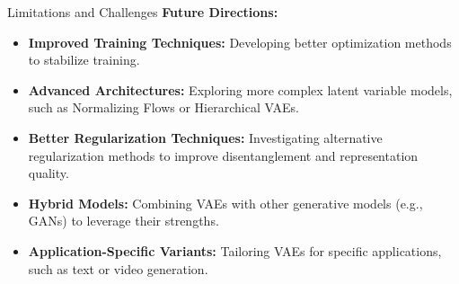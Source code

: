 \begin{frame}[allowframebreaks]{Limitations and Challenges}
\textbf{Future Directions:}
\begin{itemize}
    \item \textbf{Improved Training Techniques:} Developing better optimization methods to stabilize training.
    \item \textbf{Advanced Architectures:} Exploring more complex latent variable models, such as Normalizing Flows or Hierarchical VAEs.
    \item \textbf{Better Regularization Techniques:} Investigating alternative regularization methods to improve disentanglement and representation quality.
    \item \textbf{Hybrid Models:} Combining VAEs with other generative models (e.g., GANs) to leverage their strengths.
    \item \textbf{Application-Specific Variants:} Tailoring VAEs for specific applications, such as text or video generation.
\end{itemize}
\end{frame}